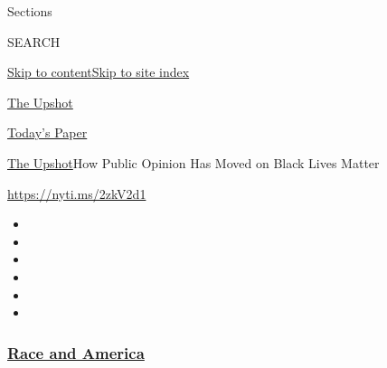 Sections

SEARCH

\protect\hyperlink{site-content}{Skip to
content}\protect\hyperlink{site-index}{Skip to site index}

\href{https://www.nytimes3xbfgragh.onion/section/upshot}{The Upshot}

\href{https://myaccount.nytimes3xbfgragh.onion/auth/login?response_type=cookie\&client_id=vi}{}

\href{https://www.nytimes3xbfgragh.onion/section/todayspaper}{Today's
Paper}

\href{/section/upshot}{The Upshot}\textbar{}How Public Opinion Has Moved
on Black Lives Matter

\url{https://nyti.ms/2zkV2d1}

\begin{itemize}
\item
\item
\item
\item
\item
\item
\end{itemize}

\hypertarget{race-and-america}{%
\subsubsection{\texorpdfstring{\href{https://www.nytimes3xbfgragh.onion/news-event/george-floyd-protests-minneapolis-new-york-los-angeles?name=styln-george-floyd\&region=TOP_BANNER\&variant=undefined\&block=storyline_menu_recirc\&action=click\&pgtype=Interactive\&impression_id=5e073410-e3a9-11ea-87d2-81bdd276209e}{Race
and America}}{Race and America}}\label{race-and-america}}

